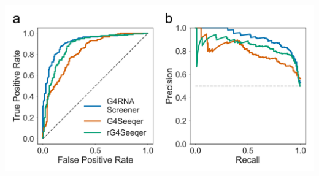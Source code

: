 \documentclass[12pt,a4paper,]{report}
\let\origfigure=\figure
\let\endorigfigure=\endfigure
\renewenvironment{figure}[1][2] {
    \expandafter\origfigure\expandafter[H]
} {
    \endorigfigure
}
\begin{document}
\begin{figure}[htbp]
\centering
\includegraphics[width=\textwidth,height=562pt,keepaspectratio]{chapter_3/figures/g4rna_roc_pr.png}
\caption[Validation of rG4Seeqer on \textit{in vitro} experimentally categorised RNA sequences]{\textbf{Validation   of   rG4Seeqer   on   \textit{in   vitro}   experimentally   categorised   RNA   sequences}   \textbf{a)}   Receiver   Operator   Characteristic   (ROC)   curves   showing   the   performance   of   rG4Seeqer,   G4Seeqer   and   the   G4RNA   Screener   method   (Garant   et   al. 2017),   on   the   G4RNA   dataset   curated   by   Garant   et   al.   \textbf{b)}   Precision-recall   curves   showing   the   performance   of   rG4Seeqer,   G4Seeqer,   and   G4RNA   Screener   on   the   same   dataset.   \label{rG4seeqer_test}}
\end{figure}
\end{document}
